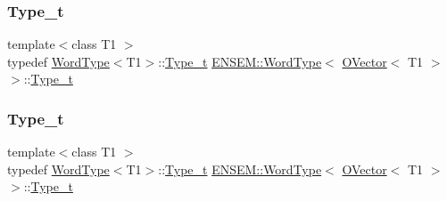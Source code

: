 \subsubsection{\texorpdfstring{Type\_t}{Type\_t}\hspace{0.1cm}{\footnotesize\ttfamily [1/3]}}
{\footnotesize\ttfamily template$<$class T1 $>$ \\
typedef \mbox{\hyperlink{structENSEM_1_1WordType}{Word\+Type}}$<$T1$>$\+::\mbox{\hyperlink{structENSEM_1_1WordType_3_01OVector_3_01T1_01_4_01_4_ab09c111517a85cf22c58611d96219000}{Type\+\_\+t}} \mbox{\hyperlink{structENSEM_1_1WordType}{E\+N\+S\+E\+M\+::\+Word\+Type}}$<$ \mbox{\hyperlink{classENSEM_1_1OVector}{O\+Vector}}$<$ T1 $>$ $>$\+::\mbox{\hyperlink{structENSEM_1_1WordType_3_01OVector_3_01T1_01_4_01_4_ab09c111517a85cf22c58611d96219000}{Type\+\_\+t}}}

\mbox{\label{structENSEM_1_1WordType_3_01OVector_3_01T1_01_4_01_4_ab09c111517a85cf22c58611d96219000}} 
\subsubsection{\texorpdfstring{Type\_t}{Type\_t}\hspace{0.1cm}{\footnotesize\ttfamily [2/3]}}
{\footnotesize\ttfamily template$<$class T1 $>$ \\
typedef \mbox{\hyperlink{structENSEM_1_1WordType}{Word\+Type}}$<$T1$>$\+::\mbox{\hyperlink{structENSEM_1_1WordType_3_01OVector_3_01T1_01_4_01_4_ab09c111517a85cf22c58611d96219000}{Type\+\_\+t}} \mbox{\hyperlink{structENSEM_1_1WordType}{E\+N\+S\+E\+M\+::\+Word\+Type}}$<$ \mbox{\hyperlink{classENSEM_1_1OVector}{O\+Vector}}$<$ T1 $>$ $>$\+::\mbox{\hyperlink{structENSEM_1_1WordType_3_01OVector_3_01T1_01_4_01_4_ab09c111517a85cf22c58611d96219000}{Type\+\_\+t}}}

\mbox{\label{structENSEM_1_1WordType_3_01OVector_3_01T1_01_4_01_4_ab09c111517a85cf22c58611d96219000}} 
